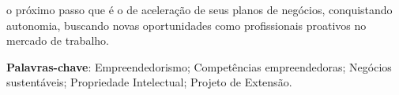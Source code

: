 \begin{resumo}
o próximo passo que é o de aceleração de seus planos de negócios, conquistando autonomia, buscando novas oportunidades como profissionais proativos no mercado de trabalho.

\textbf{Palavras-chave}: Empreendedorismo; Competências empreendedoras; Negócios sustentáveis; Propriedade Intelectual; Projeto de Extensão.
\end{resumo}